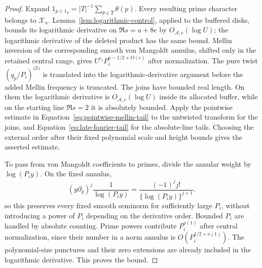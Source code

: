 \documentclass[12pt]{article}
\begin{document}
\begin{proof}
Expand \(1_{p\in1_T}=|T|^{-1}\sum_{\theta\in\widehat T}\theta(p)\).
Every resulting prime character belongs to \(\mathcal X_u\).
Lemma~\ref{lem:logarithmic-control}, applied to the buffered disks,
bounds its logarithmic derivative on \(\Re s=a+8e\) by
\(O_{\mathcal A,e}(\log U)\); the logarithmic derivative of the
deleted product has the same bound.  Mellin inversion of the
corresponding smooth von Mangoldt annulus, shifted only in the
retained central range, gives
\(U^{\epsilon_1}P_i^{a-1/2+O(e)}\) after normalization.
The pure twist \((q_p/P_i)^{i\Im z}\) is translated into the
logarithmic-derivative argument before the added Mellin frequency
is truncated.  The joins have bounded real length.  On them the
logarithmic derivative is \(O_{\mathcal A,e}(\log U)\) inside its
allocated buffer, while on the starting line \(\Re s=2\) it is
absolutely bounded.  Apply the pointwise estimate in
Equation~\eqref{eq:pointwise-mellin-tail} to the untwisted transform
for the joins, and Equation~\eqref{eq:late-fourier-tail} for the
absolute-line tails.  Choosing the external order after their fixed
polynomial scale and height bounds gives the asserted estimate.

To pass from von Mangoldt coefficients to primes, divide the
annular weight by \(\log(P_i y)\).  On the fixed annulus,
\[
 (y\partial_y)^j\frac1{\log(P_i y)}
 =\frac{(-1)^j j!}{\{\log(P_i y)\}^{j+1}},
\]
so this preserves every fixed smooth seminorm for sufficiently
large \(P_i\), without introducing a power of \(P_i\) depending on
the derivative order.  Bounded \(P_i\) are handled by absolute
counting.  Prime powers
contribute \(P_i^{o(1)}\) after central normalization, since their
number in a norm annulus is \(O(P_i^{1/2+o(1)})\).
The polynomial-size punctures and their zero extensions are already
included in the logarithmic derivative.  This proves the bound.
\end{proof}
\end{document}
